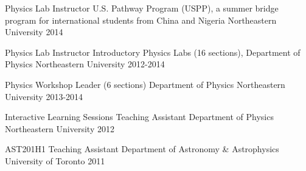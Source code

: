 
\begin{cvhonors}

  \cvhonor
    {Physics Lab Instructor} %
    {U.S. Pathway Program (USPP), a summer bridge program for international students
    from China and Nigeria
    } %
    {Northeastern University} %
    {2014} %
        
  \cvhonor
    {Physics Lab Instructor} %
    {Introductory Physics Labs (16 sections), Department of Physics} %
    {Northeastern University} %
    {2012-2014} %

  \cvhonor
    {Physics Workshop Leader} %
    {(6 sections) Department of Physics} %
    {Northeastern University} %
    {2013-2014} %

  \cvhonor
    {Interactive Learning Sessions Teaching Assistant} %
    {Department of Physics} %
    {Northeastern University} %
    {2012} %
    
  \cvhonor
    {AST201H1 Teaching Assistant} %
    {Department of Astronomy \& Astrophysics} %
    {University of Toronto} %
    {2011} %
    
\end{cvhonors}